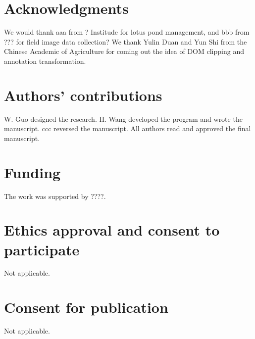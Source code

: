 \documentclass{configs/bmcart}
\begin{document}


\begin{backmatter}

\renewcommand*{\glsgroupskip}{}
\printglossary[type=\acronymtype, title=Abbreviations, nonumberlist]

\section*{Acknowledgments}
We would thank aaa from ? Institude for lotus pond management, and bbb from ??? for field image data collection? We thank Yulin Duan and Yun Shi from the Chinese Academic of Agriculture for coming out the idea of DOM clipping and annotation transformation.

\section*{Authors' contributions}
W. Guo designed the research. H. Wang developed the program and wrote the manuscript. ccc reversed the manuscript. All authors read and approved the final manuscript.

\section*{Funding}
The work was supported by ????.

\section*{Ethics approval and consent to participate}
Not applicable.

\section*{Consent for publication}
Not applicable.


\end{backmatter}
\end{document}
